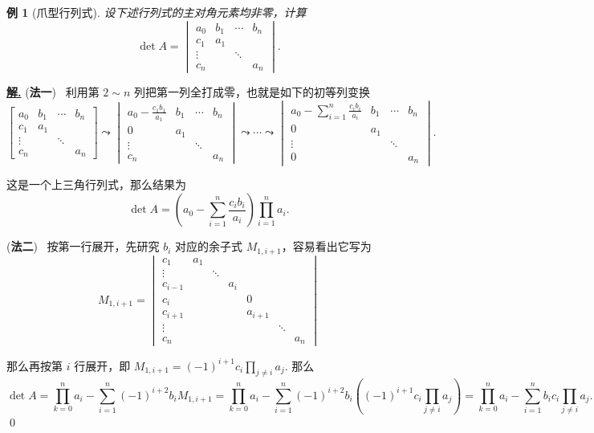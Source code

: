 \documentclass[10pt,openany]{article}
\theoremstyle{thmstyle} %
\theoremstyle{defstyle} %
\theoremstyle{prostyle} %
\theoremstyle{exastyle}
\newtheorem{example}[theorem]{例}
\theoremstyle{remstyle}
\newenvironment{solution}{\par\underline{\textbf{解.}} \;\fangsong}{\qed\par}
\begin{document}
\begin{example}[爪型行列式]
	设下述行列式的主对角元素均非零，计算
	\[ \det A= \begin{vmatrix}
		a_0 & b_1 & \cdots & b_n \\
		c_1 & a_1 &  & \\
		\vdots &  & \ddots & \\
		c_n &       &        & a_n
	\end{vmatrix}. \]
	\label{2.2.18}
\end{example}

\begin{solution}
	(\textbf{法一}) \ 利用第 \( 2 \sim n \) 列把第一列全打成零，也就是如下的初等列变换
	\[ \begin{bmatrix}
		a_0 & b_1 & \cdots & b_n \\
		c_1 & a_1 &  & \\
		\vdots &  & \ddots & \\
		c_n &       &        & a_n
	\end{bmatrix} \leadsto \begin{vmatrix}
	a_0-\frac{c_1b_1}{a_1} & b_1 & \cdots & b_n \\
	0 & a_1 &  & \\
	\vdots &  & \ddots & \\
	c_n &       &        & a_n
	\end{vmatrix} \leadsto \cdots \leadsto \begin{vmatrix}
	a_0- \sum_{i=1}^{n}\frac{c_ib_i}{a_i} & b_1 & \cdots & b_n \\
	0 & a_1 &  & \\
	\vdots &  & \ddots & \\
	0 &       &        & a_n
	\end{vmatrix}. \]
	
	这是一个上三角行列式，那么结果为 
	\[ \det A= \left( a_0- \sum_{i=1}^{n}\frac{c_ib_i}{a_i} \right) \prod_{i=1}^{n} a_i.\]
	
	(\textbf{法二}) \ 按第一行展开，先研究 \( b_i \) 对应的余子式 \( M_{1,i+1} \)，容易看出它写为
	\[ M_{1,i+1}= \begin{vmatrix}
		c_1 & a_1 & & & & & \\
		\vdots & & \ddots & & & & \\
		c_{i-1} & &  & a_i & & & \\
		c_{i} & & &  &0  & & \\
		c_{i+1} & & &  & a_{i+1}  & & \\
		\vdots & & & &  & \ddots  & \\
		c_n & & & &  &  & a_n
	\end{vmatrix}\]
	
	那么再按第 \( i \) 行展开，即 \( M_{1,i+1}=(-1)^{i+1} c_i \prod_{j \neq i}^{} a_j \). 那么
	\[ \det A= \prod_{k=0}^{n} a_i- \sum_{i=1}^{n} (-1)^{i+2} b_i M_{1,i+1}= \prod_{k=0}^{n} a_i- \sum_{i=1}^{n} (-1)^{i+2} b_i \left( (-1)^{i+1} c_i \prod_{j \neq i}^{} a_j \right)= \prod_{k=0}^{n} a_i-\sum_{i=1}^{n} b_ic_i \prod_{j \neq i}^{} a_j. \]
\end{solution}
\end{document}

